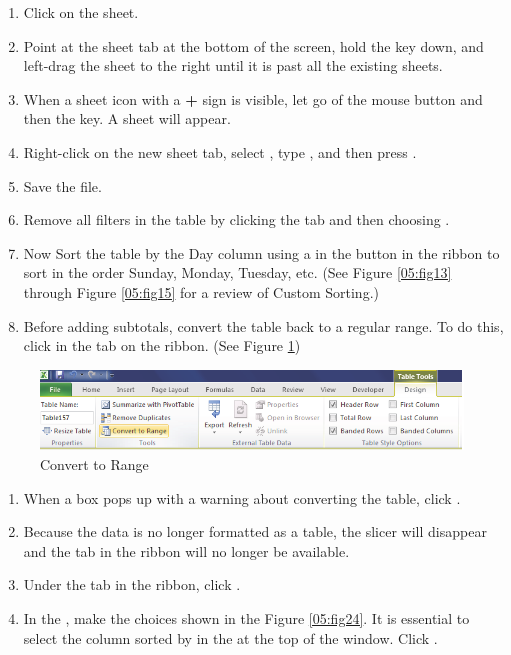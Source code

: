 \begin{enumerate}
	\item Click on the  sheet.
\item Point at the  sheet tab at the bottom of the screen, hold the  key down, and left-drag the sheet to the right until it is past all the existing sheets.
\item When a sheet icon with a \textbf{+} sign is visible, let go of the mouse button and then the  key. A  sheet will appear.
\item Right-click on the new sheet tab, select , type , and then press .
\item Save the file.
\item Remove all filters in the table by clicking the  tab and then choosing .
\item Now Sort the table by the Day column using a  in the  button in the ribbon to sort in the order Sunday, Monday, Tuesday, etc. (See Figure \ref{05:fig13} through Figure \ref{05:fig15} for a review of Custom Sorting.)
\item Before adding subtotals, convert the table back to a regular range. To do this, click  in the  tab on the ribbon. (See Figure \ref{05:fig23})
\end{enumerate}

\begin{figure}[H]
	\centering
	\includegraphics[width=\maxwidth{.95\linewidth}]{gfx/ch05_fig23}
	\caption{Convert to Range}
	\label{05:fig23}
\end{figure}

\begin{enumerate}[resume]
	\item When a box pops up with a warning about converting the table, click .
	\item Because the data is no longer formatted as a table, the slicer will disappear and the  tab in the ribbon will no longer be available.
	\item Under the  tab in the ribbon, click .
	\item In the , make the choices shown in the Figure \ref{05:fig24}. It is essential to select the column sorted by in the  at the top of the window. Click .
\end{enumerate}

